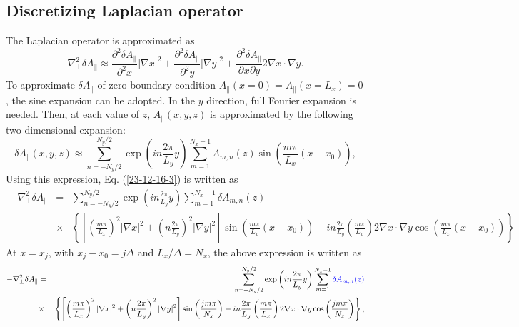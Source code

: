 \documentclass{article}
\newcommand{\nosymbol}{}
\newcommand{\tmcolor}[2]{{\color{#1}{#2}}}
\begin{document}
\subsection{Discretizing Laplacian operator }

The Laplacian operator is approximated as
\begin{equation}
  \label{23-12-16-3} \nabla_{\perp}^2 \delta A_{\parallel} \approx
  \frac{\partial^2 \delta A_{\parallel}}{\partial^2 x}  | \nabla x|^2 +
  \frac{\partial^2 \delta A_{\parallel}}{\partial^2 y}  | \nabla y|^2 +
  \frac{\partial^2 \delta A_{\parallel}}{\partial^{\nosymbol} x \partial y} 2
  \nabla x \cdot \nabla y.
\end{equation}
To approximate $\delta A_{\parallel}$ of zero boundary condition
$A_{\parallel} (x = 0) = A_{\parallel}  (x = L_x) = 0$, the sine expansion can
be adopted. In the $y$ direction, full Fourier expansion is needed. Then, at
each value of $z$, $A_{\parallel} (x, y, z)$ is approximated by the following
two-dimensional expansion:
\begin{equation}
  \delta A_{\parallel} (x, y, z) \approx \sum_{n = - N_y / 2}^{N_y / 2} \exp
  \left( i n \frac{2 \pi}{L_y} y \right) \sum_{m = 1}^{N_x - 1} A_{m, n} (z)
  \sin \left( \frac{m \pi}{L_x} (x - x_0) \right),
\end{equation}
Using this expression, Eq. (\ref{23-12-16-3}) is written as
\begin{eqnarray*}
  - \nabla_{\perp}^2 \delta A_{\parallel} & = & \sum_{n = - N_y / 2}^{N_y / 2}
  \exp \left( i n \frac{2 \pi}{L_y} y \right) \sum_{m = 1}^{N_x - 1} \delta
  A_{m, n} (z)\\
  & \times & \left\{ \left[ \left( \frac{m \pi}{L_x} \right)^2 | \nabla x|^2
  + \left( n \frac{2 \pi}{L_y} \right)^2 | \nabla y|^2 \right] \sin \left(
  \frac{m \pi}{L_x} (x - x_0) \right) - i n \frac{2 \pi}{L_y} \left( \frac{m
  \pi}{L_x} \right) 2 \nabla x \cdot \nabla y \cos \left( \frac{m \pi}{L_x} (x
  - x_0) \right) \right\}
\end{eqnarray*}
At $x = x_j$, with $x_j - x_0 = j \Delta$ and $L_x / \Delta = N_x$, the above
expression is written as
\begin{eqnarray}
  - \nabla_{\perp}^2 \delta A_{\parallel} & = & \sum_{n = - N_y / 2}^{N_y / 2}
  \exp \left( i n \frac{2 \pi}{L_y} y \right) \sum_{m = 1}^{N_x - 1}
  \tmcolor{blue}{\delta A_{m, n} (z)} \nonumber\\
  & \times & \left\{ \left[ \left( \frac{m \pi}{L_x} \right)^2 | \nabla x|^2
  + \left( n \frac{2 \pi}{L_y} \right)^2 | \nabla y|^2 \right] \sin \left(
  \frac{j m \pi}{N_x} \right) - i n \frac{2 \pi}{L_y} \left( \frac{m \pi}{L_x}
  \right) 2 \nabla x \cdot \nabla y \cos \left( \frac{j m \pi}{N_x} \right)
  \right\},  \label{23-12-16-1}
\end{eqnarray}
\end{document}
